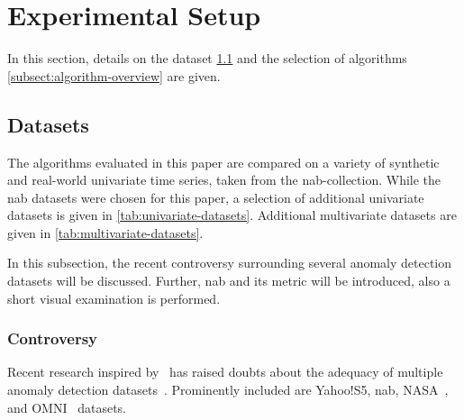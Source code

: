\section{Experimental Setup}\label{sect:experimental-setup}
In this section, details on the dataset \cref{subsect:datasets} and the selection
of algorithms \cref{subsect:algorithm-overview} are given.

\subsection{Datasets}\label{subsect:datasets}
The algorithms evaluated in this paper are compared on a variety of synthetic
and real-world univariate time series, taken from the \gls{nab}-collection.
While the \gls{nab} datasets were chosen for this paper, a selection of additional
univariate datasets is given in \cref{tab:univariate-datasets}.
Additional multivariate datasets are given in \cref{tab:multivariate-datasets}.

In this subsection, the recent controversy surrounding several anomaly detection datasets
will be discussed. Further, \gls{nab} and its metric will be introduced, also a
short visual examination is performed.

\subsubsection{Controversy}
Recent research inspired by~\cite{Nakamura.2020} has raised doubts about the
adequacy of multiple anomaly detection datasets~\cite{Renjie.2020}. Prominently
included are Yahoo!S5, \gls{nab}, NASA~\cite{Hundman.2018}, and OMNI~\cite{Su.2019}
datasets.

